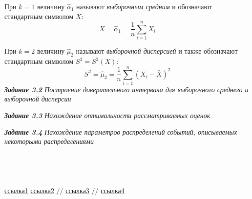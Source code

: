 \documentclass[a4paper,12pt, oneside]{book}
\begin{document}
При $k = 1$ величину $\hat{\alpha}_1$ называют {\it выборочным средним} и обозначают стандартным символом $\bar{X}$:
$$
\bar{X} = \hat{\alpha}_1 = \frac{1}{n} \sum\limits_{i = 1}^n X_i
$$

При $k = 2$ величину $\hat{\mu}_2$ называют {\it выборочной дисперсией} и  также обозначают стандартным символом $S^2 = S^2(X)$:
$$
S^2 = \hat{\mu}_2 = \frac{1}{n} \sum\limits_{i = 1}^n  (X_i - \bar{X})^2
$$
\newpage
{\large\textit{\textbf{Задание 3.2} Построение доверительного интервала для выборочного среднего и выборочной дисперсии}}

\newpage
{\large\textit{\textbf{Задание 3.3} Нахождение оптимальности рассматриваемых оценок}}

\newpage
{\large\textit{\textbf{Задание 3.4} Нахождение параметров распределений событий, описываемых некоторыми распределениями}}


\newpage
\vspace{5mm}
\\
\vspace{5mm}


\vspace{5mm}
\\
\vspace{5mm}


\begin{thebibliography}{99}
	 \href{https://towardsdatascience.com/what-is-exponential-distribution-7bdd08590e2a}{ссылка1}
	  \href{https://www.statisticshowto.datasciencecentral.com/exponential-distribution/}{ссылка2}
	  // \href{http://www.ams.jhu.edu/~dan/550.435/notes/COURSENOTES435.pdf}{ссылка3}
	  // \href{http://www.obzh.ru/nad/4-3.html}{ссылка4}
\end{thebibliography}
\end{document}

